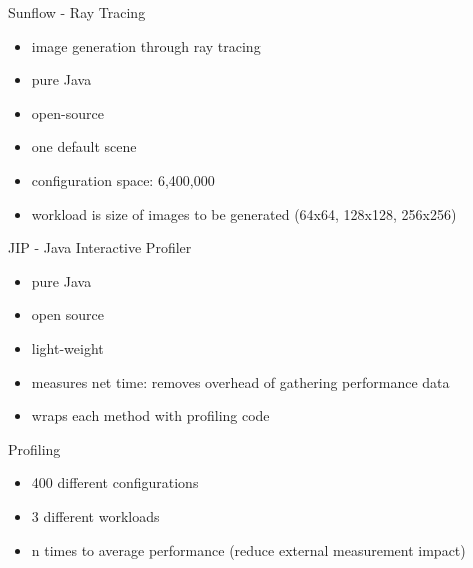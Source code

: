 \documentclass[11pt,aspectratio=169]{beamer}
\begin{document}
\begin{frame}{Sunflow - Ray Tracing}
  \begin{itemize}
    \item image generation through ray tracing
    \item pure Java
    \item open-source
    \item one default scene
    \item configuration space: 6,400,000
    \item workload is size of images to be generated (64x64, 128x128, 256x256)
  \end{itemize}
\end{frame}


\begin{frame}{JIP - Java Interactive Profiler}
  \begin{itemize}
    \item pure Java
    \item open source
    \item light-weight
    \item measures net time: removes overhead of gathering performance data
    \item wraps each method with profiling code
  \end{itemize}
\end{frame}

\begin{frame}{Profiling}
  \begin{itemize}
    \item 400 different configurations
    \item 3 different workloads
    \item n times to average performance (reduce external measurement impact)
  \end{itemize}
\end{frame}

\end{document}
